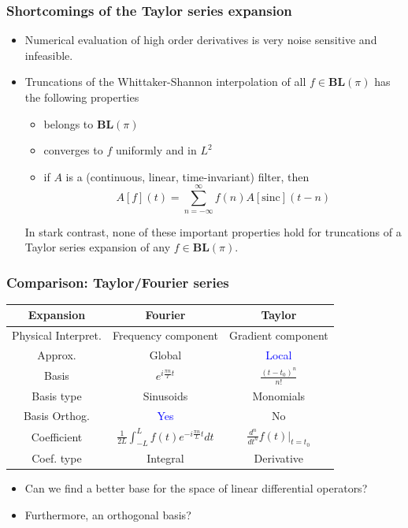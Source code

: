 \documentclass{beamer}
\begin{document}

\begin{frame}
\frametitle{Shortcomings of the Taylor series expansion}
\begin{itemize}
	\item Numerical evaluation of high order derivatives is \alert{very noise
		sensitive and infeasible.}
	\item Truncations of the Whittaker-Shannon interpolation of all 
		$f \in \mathbf{BL}(\pi)$ has the following properties
		\begin{itemize}
			\item belongs to $\mathbf{BL}(\pi)$
			\item converges to $f$ uniformly and in $L^2$
			\item if $A$ is a (continuous, linear, time-invariant) filter, then
				\begin{equation} \label{eqn:filter_prop}
					A[f](t) = \sum_{n=-\infty}^{\infty} f(n) A[\mathrm{sinc}](t-n)
				\end{equation}
		\end{itemize}
		In stark contrast, \alert{none of these important properties hold} for
		truncations of a Taylor series expansion of any $f \in \mathbf{BL}(\pi)$.
\end{itemize}
\end{frame}


\begin{frame}
\frametitle{Comparison: Taylor/Fourier series}
\begin{table}
\begin{tabular}{c c c}
\toprule
Expansion & \textbf{Fourier} & \textbf{Taylor}\\
\midrule
Physical Interpret. & Frequency component & Gradient component \\
Approx. & Global & \textcolor{blue}{Local} \\
Basis			& $e^{i \frac{\pi n}{T} t}$ & $\frac{(t-t_0)^n}{n!}$ \\
Basis type 		 & Sinusoids & Monomials \\
Basis Orthog.& \textcolor{blue}{Yes} & \alert{No} \\
Coefficient & $\frac{1}{2L} \int_{-L}^{L} f(t) e^{-i \frac{\pi n}{L} t} dt$ & $\frac{d^n}{dt^n}f(t)|_{t=t_0}$ \\
Coef. type  & Integral & \alert{Derivative} \\
\bottomrule
\end{tabular}
\end{table}

\begin{itemize}
	\item Can we find a better base for the space of linear differential operators?
	\item Furthermore, an \alert{orthogonal basis}?
\end{itemize}
\end{frame}
\end{document}
